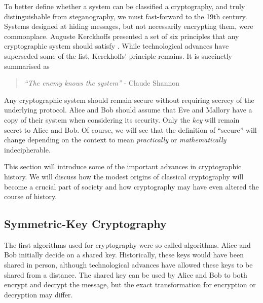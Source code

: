 
To better define whether a system can be classified a cryptography, and truly distinguishable from steganography, we must fast-forward to the 19th century. Systems designed at hiding messages, but not necessarily encrypting them, were commonplace. Auguste Kerckhoffs presented a set of six principles that any cryptographic system should satisfy \cite{KerckhoffsPrincple}. While technological advances have superseded some of the list, Kerckhoffs' principle remains. It is succinctly summarised as

\begin{quote}
\centering
\textit{``The enemy knows the system''} - Claude Shannon \cite{shannon1949communication}
\end{quote}

Any cryptographic system should remain secure without requiring secrecy of the underlying protocol. Alice and Bob should assume that Eve and Mallory have a copy of their system when considering its security. Only the \textit{key} will remain secret to Alice and Bob. Of course, we will see that the definition of ``secure'' will change depending on the context to mean \textit{practically} or \textit{mathematically} indecipherable. 

This section will introduce some of the important advances in cryptographic history. We will discuss how the modest origins of classical cryptography will become a crucial part of society and how cryptography may have even altered the course of history.

\subsection{Symmetric-Key Cryptography}

The first algorithms used for cryptography were so called  algorithms. Alice and Bob initially decide on a shared key. Historically, these keys would have been shared in person, although technological advances have allowed these keys to be shared from a distance. The shared key can be used by Alice and Bob to both encrypt and decrypt the message, but the exact transformation for encryption or decryption may differ.



